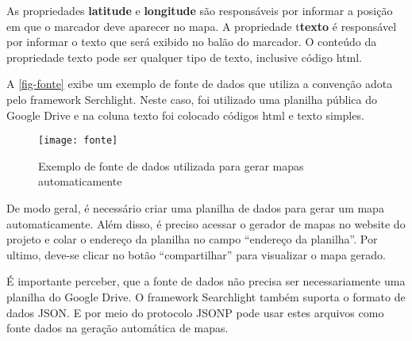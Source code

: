 As propriedades \textbf{latitude} e \textbf{longitude} são responsáveis por informar a posição em que o marcador deve aparecer no mapa. A propriedade t\textbf{texto} é responsável por informar o texto que será exibido no balão do marcador. O conteúdo da propriedade texto pode ser qualquer tipo de texto, inclusive código html.

 A \autoref{fig-fonte} exibe um exemplo de fonte de dados que utiliza a convenção adota pelo framework Serchlight. Neste caso, foi utilizado uma planilha pública do Google Drive e na coluna texto foi colocado  códigos html e texto simples. 		
  
 \begin{figure}[htb]
	\caption{\label{fig-fonte}Exemplo de fonte de dados utilizada para gerar mapas automaticamente}
	\begin{center}
	    \texttt{[image: fonte]}
	\end{center}
\end{figure}

De modo geral, é necessário criar uma planilha de dados para  gerar um mapa automaticamente. Além disso, é preciso acessar o gerador de mapas no website do projeto e colar o endereço  da planilha no campo ``endereço da planilha''. Por ultimo, deve-se clicar no botão ``compartilhar'' para visualizar o mapa gerado.

É importante perceber, que a fonte de dados não precisa ser necessariamente uma planilha do Google Drive. O framework Searchlight também suporta o formato de dados JSON. E por meio do protocolo JSONP pode usar estes arquivos como fonte dados na geração automática de mapas.  
